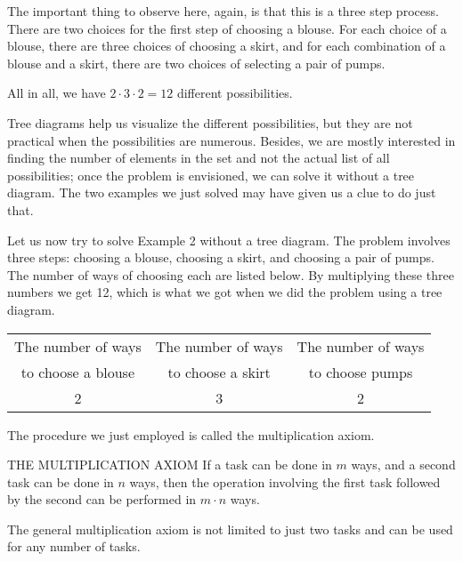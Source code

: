 \begin{solution}
    The important thing to observe here, again, is that this is a three step process. There are two choices for the first step of choosing a blouse. For each choice of a blouse, there are three choices of choosing a skirt, and for each combination of a blouse and a skirt, there are two choices of selecting a pair of pumps.

    All in all, we have $2 \cdot 3 \cdot 2 = 12$ different possibilities.
\end{solution}

Tree diagrams help us visualize the different possibilities, but they are not practical when the possibilities are numerous. Besides, we are mostly interested in finding the number of elements in the set and not the actual list of all possibilities; once the problem is envisioned, we can solve it without a tree diagram. The two examples we just solved may have given us a clue to do just that.

Let us now try to solve Example 2 without a tree diagram. The problem involves three steps: choosing a blouse, choosing a skirt, and choosing a pair of pumps. The number of ways of choosing each are listed below. By multiplying these three numbers we get 12, which is what we got when we did the problem using a tree diagram.

\begin{center}
    \begin{tabular}{|c|c|c|}
        \hline
        The number of ways & The number of ways & The number of ways \\
        to choose a blouse & to choose a skirt  & to choose pumps    \\
        \hline
        2                  & 3                  & 2                  \\
        \hline
    \end{tabular}
\end{center}

The procedure we just employed is called the multiplication axiom.

\begin{summarybox}{THE MULTIPLICATION AXIOM}
    If a task can be done in \(m\) ways, and a second task can be done in \(n\) ways, then the operation involving the first task followed by the second can be performed in \(m \cdot n\) ways.
\end{summarybox}

The general multiplication axiom is not limited to just two tasks and can be used for any number of tasks.

